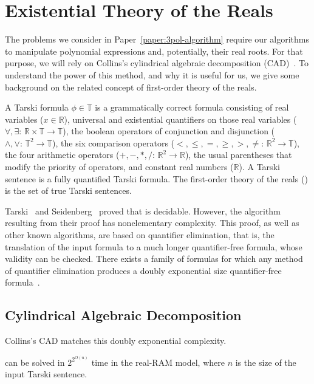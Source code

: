 \chapter{\done Existential Theory of the Reals}
\label{chapter:etr}

The problems we consider
in Paper~\ref{paper:3pol-algorithm}
require our algorithms to manipulate polynomial
expressions and, potentially, their real roots. For that purpose, we will rely
on Collins's cylindrical algebraic decomposition (CAD)~\cite{C75}.
%
To understand the power of this method, and why it is useful for us, we give some
background on the related concept of first-order theory of the reals.

\begin{definition}
	A Tarski formula $\phi \in \mathbb{T}$ is a grammatically correct formula
	consisting of real variables ($x \in \mathbb{R}$), universal and
	existential quantifiers on those real variables
	($\forall,\exists\colon\,\mathbb{R}\times\mathbb{T}\to\mathbb{T}$), the
	boolean operators of conjunction and disjunction
	($\land,\lor\colon\,\mathbb{T}^2\to\mathbb{T}$), the six comparison
	operators ($<,\le,=,\ge,>,\ne\colon\,\mathbb{R}^2\to\mathbb{T}$), the four
	arithmetic operators ($+,-,*,/\colon\,\mathbb{R}^2\to\mathbb{R}$), the
	usual parentheses that modify the priority of operators, and constant real
	numbers (\(\mathbb{R}\)).
	A Tarski sentence is a fully quantified Tarski formula.
	The first-order theory of the reals (\FOTR{}) is
	the set of true Tarski sentences.
\end{definition}

Tarski~\cite{T51} and Seidenberg~\cite{Sei74} proved that \FOTR{} is decidable.
However, the algorithm resulting from their proof has nonelementary complexity.
%
This proof, as well as other known algorithms, are based on quantifier
elimination, that is, the translation of the input formula to a much longer
quantifier-free formula, whose validity can be checked.
There exists a family of formulas for which any method of quantifier elimination
produces a doubly exponential size quantifier-free formula~\cite{DH88}.

\section{Cylindrical Algebraic Decomposition}
%
Collins's CAD matches this doubly exponential complexity.
\begin{theorem}
	\FOTR{} can be solved in $2^{2^{O(n)}}$ time in the real-RAM model, where
	\(n\) is the size of the input Tarski sentence.
\end{theorem}

